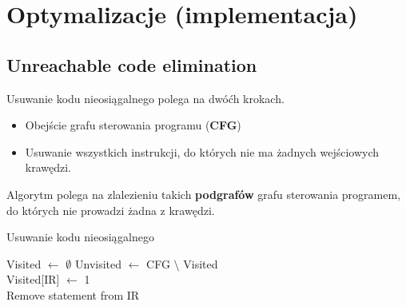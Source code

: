 \section{Optymalizacje (implementacja)}
	\subsection{Unreachable code elimination}
	
		Usuwanie kodu nieosiągalnego polega na dwóćh krokach.
		\begin{itemize}
			\item Obejście grafu sterowania programu (\textbf{CFG})
			\item Usuwanie wszystkich instrukcji, do których nie ma żadnych wejściowych krawędzi.
		\end{itemize}
		
		\spacing

		Algorytm polega na zlalezieniu takich \textbf{podgrafów} grafu sterowania programem, do których
		nie prowadzi żadna z krawędzi.
		\\

		\begin{algorithm}
			\caption{Usuwanie kodu nieosiągalnego}
			\begin{algorithmic}[1]
					\State Visited $\gets$ $\emptyset$
					\State {}
					\State Unvisited $\gets$ CFG $\setminus$ Visited
					\State {}
				\EndProcedure
				\\
					\State Visited[IR] $\gets$ 1
						\State {}
					\EndFor
				\EndProcedure
				\\
						\State Remove statement from IR
					\EndFor
				\EndProcedure
			\end{algorithmic}
		\end{algorithm}
